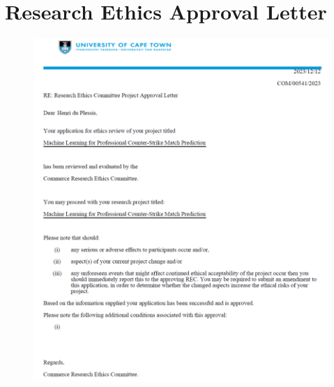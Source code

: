 
\chapter{Research Ethics Approval Letter} %

\label{dix:ethics}

\begin{figure}[ht]
	\centering
	\begin{adjustbox}{center}
		\includegraphics[width=1.1\textwidth]{Figures/ethics-approval.png}
	\end{adjustbox}
	\label{fig:ethics}
\end{figure}